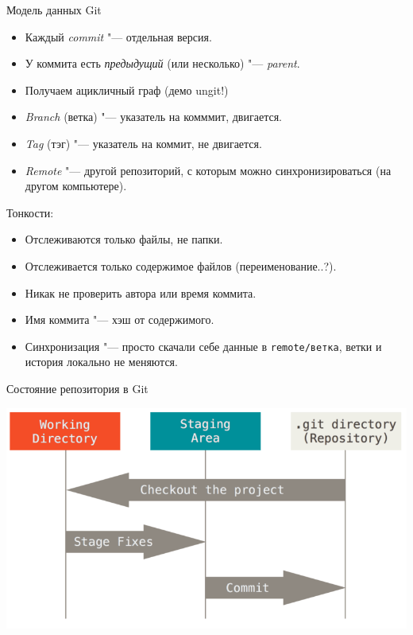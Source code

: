 \begin{frame}[t]{Модель данных Git}
\begin{itemize}
\item Каждый \textit{commit} "--- отдельная версия.
\item У коммита есть \textit{предыдущий} (или несколько) "--- \textit{parent}.
\item Получаем ацикличный граф (демо ungit!)
\item \textit{Branch} (ветка) "--- указатель на комммит, двигается.
\item \textit{Tag} (тэг) "--- указатель на коммит, не двигается.
\item \textit{Remote} "--- другой репозиторий, с которым
	можно синхронизироваться (на другом компьютере).
\end{itemize}
Тонкости:
\begin{itemize}
\item Отслеживаются только файлы, не папки.
\item Отслеживается только содержимое файлов (переименование..?).
\item Никак не проверить автора или время коммита.
\item Имя коммита "--- хэш от содержимого.
\item Синхронизация "--- просто скачали себе данные в \verb~remote/ветка~,
	ветки и история локально не меняются.
\end{itemize}
\end{frame}

\begin{frame}[t]{Состояние репозитория в Git}
\begin{center}
\includegraphics[width=\textwidth,keepaspectratio]{areas.png}
\end{center}
\end{frame}

